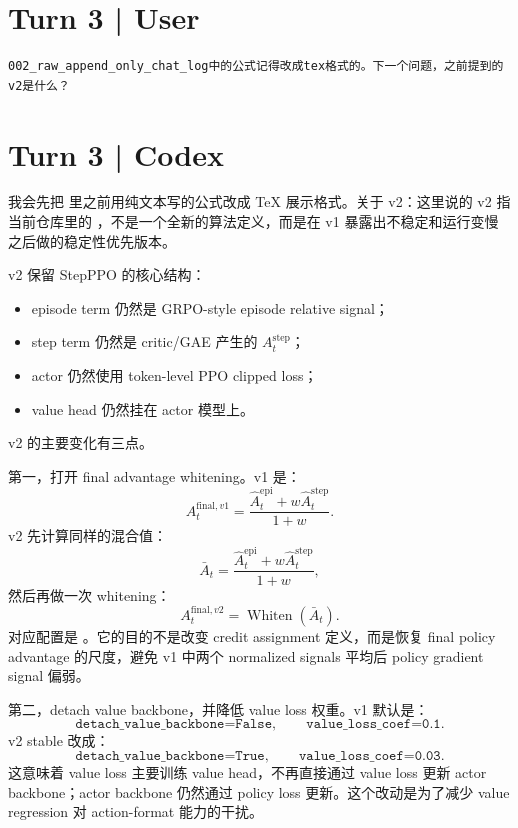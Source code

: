 \documentclass[10pt]{ctexart}
\begin{document}
\section*{Turn 3 | User}
\begin{Verbatim}[breaklines=true,breakanywhere=true]
002_raw_append_only_chat_log中的公式记得改成tex格式的。下一个问题，之前提到的v2是什么？
\end{Verbatim}

\section*{Turn 3 | Codex}
我会先把  里之前用纯文本写的公式改成 TeX 展示格式。关于 v2：这里说的 v2 指当前仓库里的 ，不是一个全新的算法定义，而是在 v1 暴露出不稳定和运行变慢之后做的稳定性优先版本。

v2 保留 StepPPO 的核心结构：
\begin{itemize}
\item episode term 仍然是 GRPO-style episode relative signal；
\item step term 仍然是 critic/GAE 产生的 $A_t^{\mathrm{step}}$；
\item actor 仍然使用 token-level PPO clipped loss；
\item value head 仍然挂在 actor 模型上。
\end{itemize}

v2 的主要变化有三点。

第一，打开 final advantage whitening。v1 是：
\[
A_t^{\mathrm{final},v1}
=
\frac{\widehat A_t^{\mathrm{epi}} + w\widehat A_t^{\mathrm{step}}}{1+w}.
\]
v2 先计算同样的混合值：
\[
\bar A_t
=
\frac{\widehat A_t^{\mathrm{epi}} + w\widehat A_t^{\mathrm{step}}}{1+w},
\]
然后再做一次 whitening：
\[
A_t^{\mathrm{final},v2}
=
\operatorname{Whiten}(\bar A_t).
\]
对应配置是 。它的目的不是改变 credit assignment 定义，而是恢复 final policy advantage 的尺度，避免 v1 中两个 normalized signals 平均后 policy gradient signal 偏弱。

第二，detach value backbone，并降低 value loss 权重。v1 默认是：
\[
\texttt{detach\_value\_backbone=False},
\qquad
\texttt{value\_loss\_coef=0.1}.
\]
v2 stable 改成：
\[
\texttt{detach\_value\_backbone=True},
\qquad
\texttt{value\_loss\_coef=0.03}.
\]
这意味着 value loss 主要训练 value head，不再直接通过 value loss 更新 actor backbone；actor backbone 仍然通过 policy loss 更新。这个改动是为了减少 value regression 对 action-format 能力的干扰。
\end{document}
